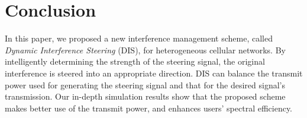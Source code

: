 \documentclass[10pt, conference, letterpaper]{IEEEtran}
\begin{document}
%



\section{Conclusion}

In this paper, we proposed a new interference management scheme,
called \textit{Dynamic Interference Steering} (DIS), for heterogeneous cellular networks.
By intelligently determining the strength of the steering signal,
the original interference is steered into an appropriate direction.
DIS can balance the transmit power used for generating the steering signal
and that for the desired signal's transmission.
Our in-depth simulation results show that the
proposed scheme makes better use of the transmit
power, and enhances users' spectral efficiency.

\end{document}
